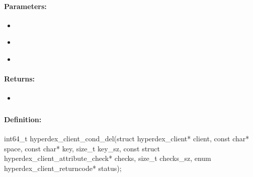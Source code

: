 \paragraph{Parameters:}
\begin{itemize}[noitemsep]
\item {}\\

\item {}\\

\item {}\\

\end{itemize}

\paragraph{Returns:}
\begin{itemize}[noitemsep]
\item {}\\

\end{itemize}

\pagebreak
\subsubsection{}
\label{api:c:cond_del}


\paragraph{Definition:}
\begin{ccode}
int64_t hyperdex_client_cond_del(struct hyperdex_client* client,
        const char* space,
        const char* key, size_t key_sz,
        const struct hyperdex_client_attribute_check* checks, size_t checks_sz,
        enum hyperdex_client_returncode* status);
\end{ccode}

